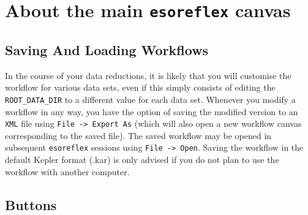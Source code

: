 \section{About the main {\tt esoreflex} canvas \label{sec:about_canvas}}

\subsection{Saving And Loading Workflows}

In the course of your data reductions, it is likely that you will
customise the workflow for various data sets, even if this simply
consists of editing the {\tt ROOT\_DATA\_DIR} to a different value for
each data set.  Whenever you modify a workflow in any way, you have
the option of saving the modified version to an {\tt XML} file using
{\tt File -> Export As} (which will also open a new workflow canvas
corresponding to the saved file).  The saved workflow may be opened in
subsequent {\tt esoreflex} sessions using {\tt File -> Open}. Saving the
workflow in the default Kepler format (.kar) is only advised if you do
not plan to use the workflow with another computer.

\subsection{Buttons}  
         
